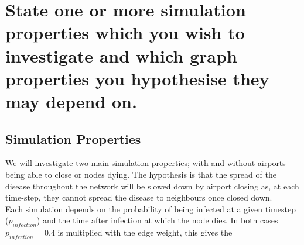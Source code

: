 \documentclass[a4paper,11pt]{article}
\begin{document}
\section{State one or more simulation properties which you wish to investigate and which graph properties you hypothesise they may depend on.}

\subsection*{Simulation Properties}
We will investigate two main simulation properties; with and without airports being able to close or nodes dying. The hypothesis is that the spread of the disease throughout the network will be slowed down by airport closing as, at each time-step, they cannot spread the disease to neighbours once closed down. \\
Each simulation depends on the probability of being infected at a given timestep ($p_{infection}$) and the time after infection at which the node dies. In both cases $p_{infection} = 0.4$ is multiplied with the edge weight, this gives the 
\end{document}
